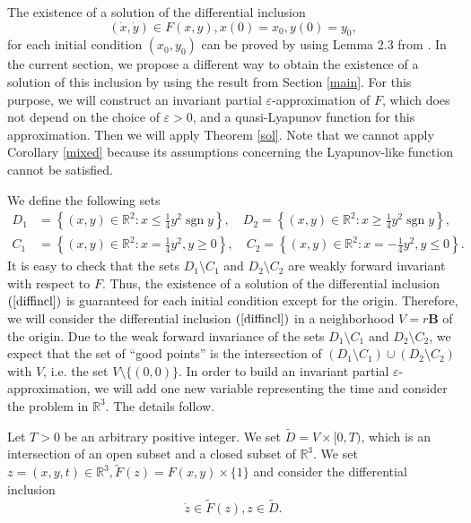 \documentclass[a4paper]{article}
\DeclareMathOperator{\sgn}{sgn}
\begin{document}
The existence of a solution of the differential inclusion
\begin{equation}\label{diffincl}
    (\dot{x},\dot{y}) \in F(x,y), x(0)=x_0, y(0)=y_0,
\end{equation} for each initial condition $(x_0,y_0)$ can be proved by using Lemma 2.3 from \cite{ZB}. In the current section, we propose a different way to obtain the existence of a solution of this inclusion by using the result from Section \ref{main}. For this purpose, we will construct an invariant partial $\varepsilon$-approximation of $F$, which does not depend on the choice of $\varepsilon > 0$, and a quasi-Lyapunov function for this approximation. Then we will apply Theorem \ref{sol}. Note that we cannot apply Corollary \ref{mixed} because its assumptions concerning the Lyapunov-like function cannot be satisfied.


We define the following sets
\begin{align*}
   D_1 &= \left\{(x,y) \in \mathbb{R}^2 : x \le \frac{1}{4}y^2 \sgn y\right\},\quad D_2 = \left\{(x,y) \in \mathbb{R}^2 : x \ge \frac{1}{4}y^2 \sgn y\right\},\quad \\
C_1 &= \left\{(x,y) \in \mathbb{R}^2 : x = \frac{1}{4}y^2, y \ge 0\right\},\quad C_2 = \left\{(x,y) \in \mathbb{R}^2 : x = -\frac{1}{4}y^2 , y \le 0\right\}.
\end{align*}
It is easy to check that the sets $D_1 \setminus C_1$ and $D_2 \setminus C_2$ are weakly forward invariant with respect to $F$. Thus, the existence of a solution of the differential inclusion $(\ref{diffincl})$ is guaranteed for each initial condition except for the origin. Therefore, we will consider the differential inclusion $(\ref{diffincl})$ in a neighborhood $V=r\mathbf{B}$ of the origin. Due to the weak forward invariance of the sets $D_1 \setminus C_1$ and $D_2 \setminus C_2$, we expect that the set of ``good points'' is the intersection of $\left(D_1 \setminus C_1\right) \cup \left(D_2 \setminus C_2\right)$ with $V$, i.e. the set $V \setminus \{(0,0)\}$. In order to build an invariant partial $\varepsilon$-approximation, we will add one new variable representing the time and consider the problem in $\mathbb{R}^3$. The details follow.

Let $T > 0$ be an arbitrary positive integer. We set $\widetilde{D} = V \times [0,T)$, which is an intersection of an open subset and a closed subset of $\mathbb{R}^3$. We set $z=(x,y,t) \in \mathbb{R}^3, \widetilde{F}(z) = F(x,y) \times \{1\}$ and consider the differential inclusion $$\dot{z} \in \widetilde{F}(z), z \in \widetilde{D}.$$
\end{document}
